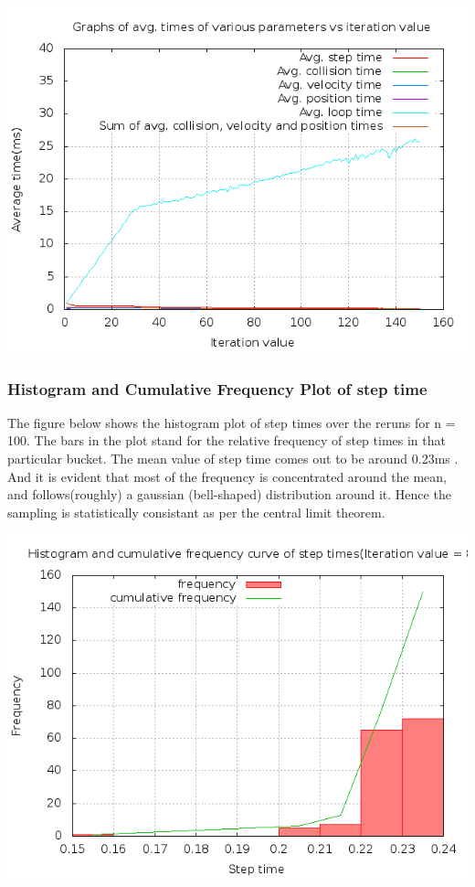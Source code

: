 \documentclass[11pt]{article}
\begin{document}
\begin{center} 
\includegraphics [scale=0.45]{./images/g29_plot02.png} 
\end{center}

\subsubsection{Histogram and Cumulative Frequency Plot of step time}
The figure below shows the histogram plot of step times over the reruns for n = 100. The bars in the plot stand for the relative frequency of step times in that particular bucket. The mean value of step time comes out to be around 0.23ms . And it is evident that most of the frequency is concentrated around the mean, and follows(roughly) a gaussian (bell-shaped) distribution around it. Hence the sampling is statistically consistant as per the central limit theorem. 

\begin{center} 
\includegraphics [scale=0.45]{./images/g29_plot04.png} 
\end{center}
\end{document}
